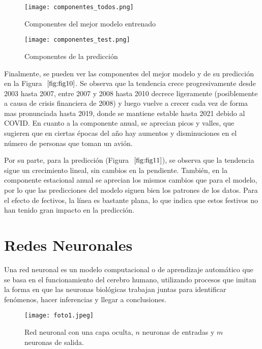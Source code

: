 \documentclass[12pt,twoside]{article}
\begin{document}
\begin{figure}[h]
    \centering
    \texttt{[image: componentes\_todos.png]}
    \caption{Componentes del mejor modelo entrenado }
    \label{fig:fig10}
    \texttt{[image: componentes\_test.png]}
    \caption{Componentes de la predicción} 
    \label{fig:fig11}
\end{figure}

Finalmente, se pueden ver las componentes del mejor modelo y de su predicción en la Figura $~\ref{fig:fig10}$. Se observa que la tendencia crece progresivamente desde 2003 hasta 2007, entre 2007 y 2008 hasta 2010 decrece ligeramente (posiblemente a causa de crisis financiera de 2008) y luego vuelve a crecer cada vez de forma mas pronunciada hasta 2019, donde se mantiene estable hasta 2021 debido al COVID. En cuanto a la componente anual, se aprecian picos y valles, que sugieren que en ciertas épocas del año hay aumentos y disminuciones en el número de personas que toman un avión.

Por su parte, para la predicción (Figura $~\ref{fig:fig11}$), se observa que la tendencia sigue un crecimiento lineal, sin cambios en la pendiente. También, en la componente estacional anual se aprecian los mismos cambios que para el modelo, por lo que las predicciones del modelo siguen bien los patrones de los datos. Para el efecto de fectivos, la línea es bastante plana, lo que indica que estos festivos no han tenido gran impacto en la predicción.










\newpage


\section{Redes Neuronales}\label{sec:10}

Una red neuronal \cite{redes1} es un modelo computacional o de aprendizaje automático que se basa en el funcionamiento del cerebro humano, utilizando procesos que imitan la forma en que las neuronas biológicas trabajan juntas para identificar fenómenos, hacer inferencias y llegar a conclusiones.

\begin{figure}[h]
    \centering
    \texttt{[image: foto1.jpeg]}
    \caption{Red neuronal con una capa oculta, $n$ neuronas de entradas y $m$ neuronas de salida.} 
    \label{fig:fig12}
\end{figure}
\end{document}
